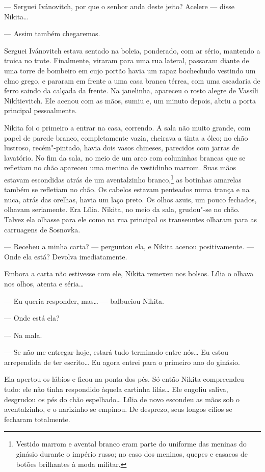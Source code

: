 --- Serguei Ivánovitch, por que o senhor anda deste jeito? Acelere ---
disse Nikita\ldots{}

--- Assim também chegaremos.

Serguei Ivánovitch estava sentado na boleia, ponderado, com ar sério,
mantendo a troica no trote. Finalmente, viraram para uma rua lateral,
passaram diante de uma torre de bombeiro em cujo portão havia um rapaz
bochechudo vestindo um elmo grego, e pararam em frente a uma casa branca
térrea, com uma escadaria de ferro saindo da calçada da frente. Na
janelinha, apareceu o rosto alegre de Vassíli Nikítievitch. Ele acenou
com as mãos, sumiu e, um minuto depois, abriu a porta principal
pessoalmente.

Nikita foi o primeiro a entrar na casa, correndo. A sala não muito
grande, com papel de parede branco, completamente vazia, cheirava a
tinta a óleo; no chão lustroso, recém"-pintado, havia dois vasos
chineses, parecidos com jarras de lavatório. No fim da sala, no meio de
um arco com coluninhas brancas que se refletiam no chão apareceu uma
menina de vestidinho marrom. Suas mãos estavam escondidas atrás de um
aventalzinho branco,\footnote{Vestido marrom e avental branco eram parte
  do uniforme das meninas do ginásio durante o império russo; no caso
  dos meninos, quepes e casacos de botões brilhantes à moda militar.} as
botinhas amarelas também se refletiam no chão. Os cabelos estavam
penteados numa trança e na nuca, atrás das orelhas, havia um laço preto.
Os olhos azuis, um pouco fechados, olhavam seriamente. Era Lília.
Nikita, no meio da sala, grudou"-se no chão. Talvez ela olhasse para
ele como na rua principal os transeuntes olharam para as carruagens de
Sosnovka.

--- Recebeu a minha carta? --- perguntou ela, e Nikita acenou
positivamente. --- Onde ela está? Devolva imediatamente.

Embora a carta não estivesse com ele, Nikita remexeu nos bolsos. Lília
o olhava nos olhos, atenta e séria\ldots{}

--- Eu queria responder, mas\ldots{} --- balbuciou Nikita.

--- Onde está ela?

--- Na mala.

--- Se não me entregar hoje, estará tudo terminado entre nós\ldots{} Eu estou
arrependida de ter escrito\ldots{} Eu agora entrei para o primeiro ano do
ginásio.

Ela apertou os lábios e ficou na ponta dos pés. Só então Nikita
compreendeu tudo: ele não tinha respondido àquela cartinha lilás\ldots{} Ele
engoliu saliva, desgrudou os pés do chão espelhado\ldots{} Lília de novo
escondeu as mãos sob o aventalzinho, e o narizinho se empinou. De
desprezo, seus longos cílios se fecharam totalmente.

